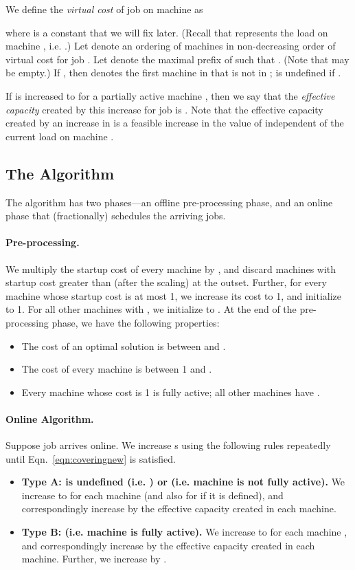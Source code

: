 \documentclass[11pt]{article}
\begin{document}
We define the {\em virtual cost} of job  on machine  as 

where  is a constant that we will fix later. 
(Recall that  represents the load on machine , 
i.e. .)
Let  denote
an ordering of machines in non-decreasing order of virtual cost 
 for job . 
Let  denote the maximal prefix of  such that 
. (Note that  may be empty.)  
If , then  
denotes the first machine in  that is not in ; 
 is undefined if .

If  is increased to  for a partially
active machine , then
we say that the {\em effective capacity} created by this increase 
for job  is .
Note that the effective capacity created by an increase in  
is a feasible increase in the value of  independent of the 
current load on machine .

\subsection{The Algorithm}
The algorithm has two phases---an offline pre-processing phase, and
an online phase that (fractionally) schedules the arriving jobs.
 
\paragraph{Pre-processing.} We multiply the startup cost of every machine
by , and discard machines with startup cost greater than 
(after the scaling) at the outset. Further, for every machine 
whose startup cost is at most 1, we increase its
cost to 1, and initialize  to 1. For all other
machines with , we initialize  to .
At the end of the pre-processing phase, we have the following properties:
\begin{itemize}
	\item The cost of an optimal solution is between  and .
	\item The cost of every machine is between 1 and .
	\item Every machine whose cost is 1 is fully active; all other
	machines have .
\end{itemize}



\paragraph{Online Algorithm.}
Suppose job  arrives online. 
We increase s using the following rules repeatedly until 
Eqn.~\ref{eqn:coveringnew} is satisfied.
\begin{itemize}
\item {\bf Type A:  is undefined (i.e. ) or 
 (i.e. machine  is not fully active).} 
We increase  to  for each machine 
 (and also for  if it is defined), and correspondingly
increase  by the effective capacity created in each machine.
\item {\bf Type B:  (i.e. machine  is fully active).}
We increase  to  for each machine 
, and correspondingly increase  by the effective 
capacity created in each machine. Further,
we increase  by . 
\end{itemize}
\end{document}
